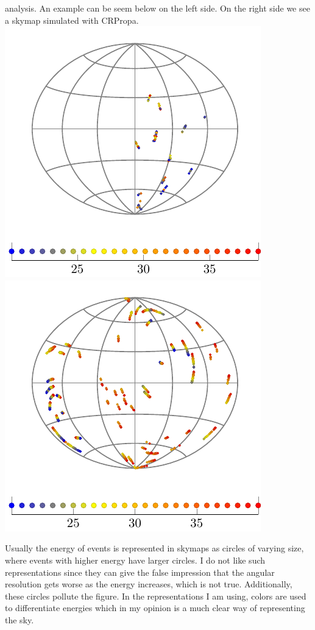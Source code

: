 \documentclass[12pt]{article}
\begin{document}
analysis. An example can be seem below on the left side. On the right side we
see a skymap simulated with CRPropa. \\
\includegraphics[scale=1.0]{mult-cand.pdf} 
\includegraphics[scale=1.0]{crpropa.pdf}

Usually the energy of events is represented in skymaps as circles of varying
size, where events with higher energy have larger circles. I do not like such
representations since they can give the false impression that the angular
resolution gets worse as the energy increases, which is not true. Additionally,
these circles pollute the figure. In the representations I am using, colors
are used to differentiate energies which in my opinion is a much clear way of
representing the sky.
\end{document}
